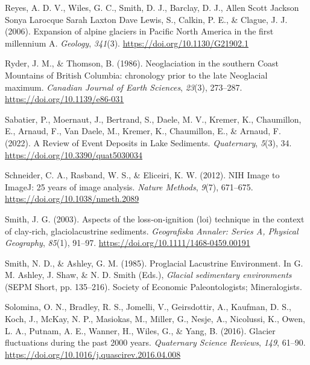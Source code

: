 \documentclass[
  letterpaper,
  DIV=11,
  numbers=noendperiod]{scrartcl}
\newlength{\cslhangindent}
\newlength{\cslentryspacingunit} %
\newenvironment{CSLReferences}[2] %
 {%
  \setlength{\parindent}{0pt}
  \ifodd #1
  \let\oldpar\par
  \def\par{\hangindent=\cslhangindent\oldpar}
  \fi
  \setlength{\parskip}{#2\cslentryspacingunit}
 }%
 {}
\begin{document}
\begin{CSLReferences}{1}{0}
\leavevmode{}%
Reyes, A. D. V., Wiles, G. C., Smith, D. J., Barclay, D. J., Allen Scott
Jackson Sonya Larocque Sarah Laxton Dave Lewis, S., Calkin, P. E., \&
Clague, J. J. (2006). {Expansion of alpine glaciers in Pacific North
America in the first millennium A}. \emph{Geology}, \emph{341}(3).
\url{https://doi.org/10.1130/G21902.1}

\leavevmode{}%
Ryder, J. M., \& Thomson, B. (1986). {Neoglaciation in the southern
Coast Mountains of British Columbia: chronology prior to the late
Neoglacial maximum}. \emph{Canadian Journal of Earth Sciences},
\emph{23}(3), 273--287. \url{https://doi.org/10.1139/e86-031}

\leavevmode{}%
Sabatier, P., Moernaut, J., Bertrand, S., Daele, M. V., Kremer, K.,
Chaumillon, E., Arnaud, F., Van Daele, M., Kremer, K., Chaumillon, E.,
\& Arnaud, F. (2022). {A Review of Event Deposits in Lake Sediments}.
\emph{Quaternary}, \emph{5}(3), 34.
\url{https://doi.org/10.3390/quat5030034}

\leavevmode{}%
Schneider, C. A., Rasband, W. S., \& Eliceiri, K. W. (2012). {NIH Image
to ImageJ: 25 years of image analysis}. \emph{Nature Methods},
\emph{9}(7), 671--675. \url{https://doi.org/10.1038/nmeth.2089}

\leavevmode{}%
Smith, J. G. (2003). {Aspects of the loss‐on‐ignition (loi) technique in
the context of clay‐rich, glaciolacustrine sediments}. \emph{Geografiska
Annaler: Series A, Physical Geography}, \emph{85}(1), 91--97.
\url{https://doi.org/10.1111/1468-0459.00191}

\leavevmode{}%
Smith, N. D., \& Ashley, G. M. (1985). {Proglacial Lacustrine
Environment}. In G. M. Ashley, J. Shaw, \& N. D. Smith (Eds.),
\emph{Glacial sedimentary environments} (SEPM Short, pp. 135--216).
Society of Economic Paleontologists; Mineralogists.

\leavevmode{}%
Solomina, O. N., Bradley, R. S., Jomelli, V., Geirsdottir, A., Kaufman,
D. S., Koch, J., McKay, N. P., Masiokas, M., Miller, G., Nesje, A.,
Nicolussi, K., Owen, L. A., Putnam, A. E., Wanner, H., Wiles, G., \&
Yang, B. (2016). {Glacier fluctuations during the past 2000 years}.
\emph{Quaternary Science Reviews}, \emph{149}, 61--90.
\url{https://doi.org/10.1016/j.quascirev.2016.04.008}


\end{CSLReferences}
\end{document}
